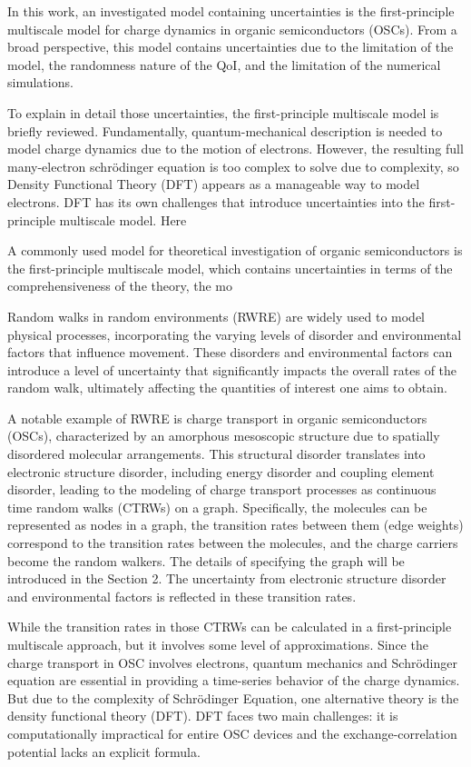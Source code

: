 \documentclass[letterpaper,12pt]{article}
\begin{document}
In this work, an investigated model containing uncertainties is the first-principle multiscale model for charge dynamics in organic semiconductors (OSCs).
From a broad perspective, this model contains uncertainties due to the limitation of the model, the randomness nature of the QoI, and the limitation of the numerical simulations.

To explain in detail those uncertainties, the first-principle multiscale model is briefly reviewed. 
Fundamentally, quantum-mechanical description is needed to model charge dynamics due to the motion of electrons. However, the resulting full many-electron schr\"{o}dinger equation is too complex to solve due to complexity, so Density Functional Theory (DFT) appears as a manageable way to model electrons.
DFT has its own challenges that introduce uncertainties into the first-principle multiscale model. 
{\huge Here}

A commonly used model for theoretical investigation of organic semiconductors is the first-principle multiscale model, which contains uncertainties in terms of the comprehensiveness of the theory, the mo

Random walks in random environments (RWRE) are widely used to model physical processes, incorporating the varying levels of disorder and environmental factors that influence movement. 
These disorders and environmental factors can introduce a level of uncertainty that significantly impacts the overall rates of the random walk, ultimately affecting the quantities of interest one aims to obtain.


A notable example of RWRE is charge transport in organic semiconductors (OSCs), characterized by an amorphous mesoscopic structure due to spatially disordered molecular arrangements. 
This structural disorder translates into electronic structure disorder, including energy disorder and coupling element disorder, leading to the modeling of charge transport processes as continuous time random walks (CTRWs) on a graph. 
Specifically, the molecules can be represented as nodes in a graph, the transition rates between them (edge weights) correspond to the transition rates between the molecules, and the charge carriers become the random walkers. The details of specifying the graph will be introduced in the Section 2. The uncertainty from electronic structure disorder and environmental factors is reflected in these transition rates.

While the transition rates in those CTRWs can be calculated in a first-principle multiscale approach, but it involves some level of approximations. 
Since the charge transport in OSC involves electrons, quantum mechanics and Schr\"odinger equation are essential in providing a time-series behavior of the charge dynamics. 
But due to the complexity of Schr\"odinger Equation, one alternative theory is the density functional theory (DFT). 
DFT faces two main challenges: it is computationally impractical for entire OSC devices and the exchange-correlation potential lacks an explicit formula.
\end{document}

